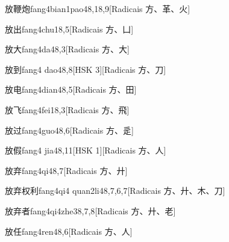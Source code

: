 \begin{entry}{放鞭炮}{fang4bian1pao4}{8,18,9}[Radicais ⽅、⾰、⽕]
\end{entry}

\begin{entry}{放出}{fang4chu1}{8,5}[Radicais ⽅、⼐]
\end{entry}

\begin{entry}{放大}{fang4da4}{8,3}[Radicais ⽅、⼤]
\end{entry}

\begin{entry}{放到}{fang4 dao4}{8,8}[HSK 3][Radicais ⽅、⼑]
\end{entry}

\begin{entry}{放电}{fang4dian4}{8,5}[Radicais ⽅、⽥]
\end{entry}

\begin{entry}{放飞}{fang4fei1}{8,3}[Radicais ⽅、⾶]
\end{entry}

\begin{entry}{放过}{fang4guo4}{8,6}[Radicais ⽅、⾡]
\end{entry}

\begin{entry}{放假}{fang4 jia4}{8,11}[HSK 1][Radicais ⽅、⼈]
\end{entry}

\begin{entry}{放弃}{fang4qi4}{8,7}[Radicais ⽅、⼶]
\end{entry}

\begin{entry}{放弃权利}{fang4qi4 quan2li4}{8,7,6,7}[Radicais ⽅、⼶、⽊、⼑]
\end{entry}

\begin{entry}{放弃者}{fang4qi4zhe3}{8,7,8}[Radicais ⽅、⼶、⽼]
\end{entry}

\begin{entry}{放任}{fang4ren4}{8,6}[Radicais ⽅、⼈]
\end{entry}

